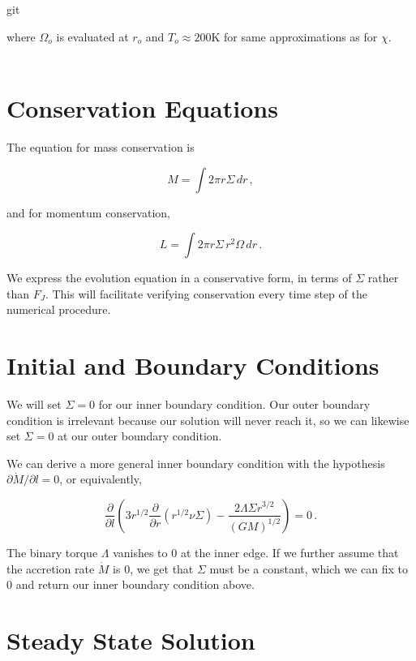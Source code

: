 git\documentclass{article}
\begin{document}
where $\Omega_o$ is evaluated at $r_o$ and $T_o \approx 200$K for same approximations as for $\chi$.\\\\

\section{Conservation Equations}

The equation for mass conservation is

\begin{equation}
M = \int 2\pi r \Sigma\, dr\,,
\end{equation}

and for momentum conservation,

\begin{equation}
\textit{L} = \int2\pi r \Sigma\, r^2 \Omega\, dr\,.
\end{equation}

We express the evolution equation in a conservative form, in terms of $\Sigma$ rather than $F_J$. This will facilitate verifying conservation every time step of the numerical procedure.

\section{Initial and Boundary Conditions}

We will set $\Sigma = 0$ for our inner boundary condition. Our outer boundary condition is irrelevant because our solution will never reach it, so we can likewise set $\Sigma = 0$ at our outer boundary condition. 

We can derive a more general inner boundary condition with the hypothesis $\partial \dot{M}/ \partial l = 0$, or equivalently,

\begin{equation}
\frac{\partial}{\partial l} \left(3 r^{1/2} \frac{\partial}{\partial r} \left(r^{1/2} \nu \Sigma\right) - \frac{2 \Lambda \Sigma r^{3/2}}{(G M)^{1/2}}\right)= 0\,.
\end{equation}

The binary torque $\Lambda$ vanishes to 0 at the inner edge. If we further assume that the accretion rate $\dot{M}$ is 0, we get that $\Sigma$ must be a constant, which we can fix to 0 and return our inner boundary condition above.

\section{Steady State Solution}
\end{document}

